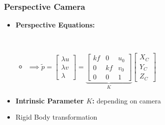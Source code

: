 \documentclass[a4paper]{article}
\newcommand{\ides}[1]{\item \textbf{#1}}
\begin{document}
\subsubsection{Perspective Camera}
\begin{itemize}
    \ides{Perspective Equations:}\\
        \\
        \begin{itemize}
            \item $\implies \tilde p =
                \begin{bmatrix}
                    \lambda u\\
                    \lambda v\\
                    \lambda
                \end{bmatrix} =
                \underbrace{
                \begin{bmatrix}
                    kf & 0 & u_0\\
                    0 & kf & v_0\\
                    0 & 0 & 1
                \end{bmatrix}}_{K}
                \begin{bmatrix}
                    X_C\\
                    Y_C\\
                    Z_C
                \end{bmatrix}$
        \end{itemize}
    \ides{Intrinsic Parameter $K$:} depending on camera
    \item Rigid Body transformation\\

\end{itemize}
\end{document}
